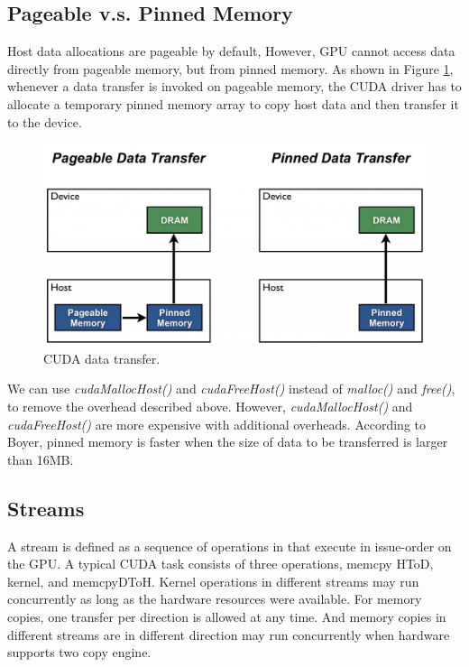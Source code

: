 \documentclass[journal,11pt,onecolumn,draftclsnofoot]{ieeeconf}  %
\begin{document}
\subsection{Pageable v.s. Pinned Memory} \label{pinned}
Host data allocations are pageable by default, However, GPU cannot access data directly from pageable memory, but from pinned memory. As shown in Figure \ref{CUDA data transfer.}, whenever a data transfer is invoked on pageable memory, the CUDA driver has to allocate a temporary pinned memory array to copy host data and then transfer it to the device. \par
\begin{figure}[h]

	\centering\includegraphics[width=120mm]{pinned.jpg}
	\caption{CUDA data transfer.\cite{Mark}}
	\label{CUDA data transfer.}
		\vspace*{-5mm}
\end{figure}
We can use \textit{cudaMallocHost()} and \textit{cudaFreeHost()} instead of \textit{malloc()} and \textit{free()}, to remove the overhead described above. However, \textit{cudaMallocHost()} and \textit{cudaFreeHost()} are more expensive with additional overheads. According to Boyer\cite{Trade_off}, pinned memory is faster when the size of data to be transferred is larger than 16MB. \par

\subsection{Streams} \label{stream}
A stream is defined as a sequence of operations in that execute in issue-order on the GPU. A typical CUDA task consists of three operations, memcpy HToD, kernel, and memcpyDToH. Kernel operations in different streams may run concurrently as long as the hardware resources were available. For memory copies, one transfer per direction is allowed at any time. And memory copies in different streams are in different direction may run concurrently when hardware supports two copy engine.   \par
\end{document}
